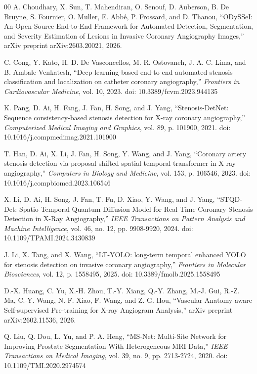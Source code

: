 \documentclass[conference]{IEEEtran}
\begin{document}
\begin{thebibliography}{00}
 A. Choudhary, X. Sun, T. Mahendiran, O. Senouf, D. Auberson, B. De Bruyne, S. Fournier, O. Muller, E. Abbé, P. Frossard, and D. Thanou, ``ODySSeI: An Open-Source End-to-End Framework for Automated Detection, Segmentation, and Severity Estimation of Lesions in Invasive Coronary Angiography Images,'' arXiv preprint arXiv:2603.20021, 2026.

 C. Cong, Y. Kato, H. D. De Vasconcellos, M. R. Ostovaneh, J. A. C. Lima, and B. Ambale-Venkatesh, ``Deep learning-based end-to-end automated stenosis classification and localization on catheter coronary angiography,'' \textit{Frontiers in Cardiovascular Medicine}, vol. 10, 2023. doi: 10.3389/fcvm.2023.944135

 K. Pang, D. Ai, H. Fang, J. Fan, H. Song, and J. Yang, ``Stenosis-DetNet: Sequence consistency-based stenosis detection for X-ray coronary angiography,'' \textit{Computerized Medical Imaging and Graphics}, vol. 89, p. 101900, 2021. doi: 10.1016/j.compmedimag.2021.101900

 T. Han, D. Ai, X. Li, J. Fan, H. Song, Y. Wang, and J. Yang, ``Coronary artery stenosis detection via proposal-shifted spatial-temporal transformer in X-ray angiography,'' \textit{Computers in Biology and Medicine}, vol. 153, p. 106546, 2023. doi: 10.1016/j.compbiomed.2023.106546

 X. Li, D. Ai, H. Song, J. Fan, T. Fu, D. Xiao, Y. Wang, and J. Yang, ``STQD-Det: Spatio-Temporal Quantum Diffusion Model for Real-Time Coronary Stenosis Detection in X-Ray Angiography,'' \textit{IEEE Transactions on Pattern Analysis and Machine Intelligence}, vol. 46, no. 12, pp. 9908-9920, 2024. doi: 10.1109/TPAMI.2024.3430839

 J. Li, X. Tang, and X. Wang, ``LT-YOLO: long-term temporal enhanced YOLO for stenosis detection on invasive coronary angiography,'' \textit{Frontiers in Molecular Biosciences}, vol. 12, p. 1558495, 2025. doi: 10.3389/fmolb.2025.1558495

 D.-X. Huang, C. Yu, X.-H. Zhou, T.-Y. Xiang, Q.-Y. Zhang, M.-J. Gui, R.-Z. Ma, C.-Y. Wang, N.-F. Xiao, F. Wang, and Z.-G. Hou, ``Vascular Anatomy-aware Self-supervised Pre-training for X-ray Angiogram Analysis,'' arXiv preprint arXiv:2602.11536, 2026.

 Q. Liu, Q. Dou, L. Yu, and P. A. Heng, ``MS-Net: Multi-Site Network for Improving Prostate Segmentation With Heterogeneous MRI Data,'' \textit{IEEE Transactions on Medical Imaging}, vol. 39, no. 9, pp. 2713-2724, 2020. doi: 10.1109/TMI.2020.2974574


\end{thebibliography}
\end{document}
